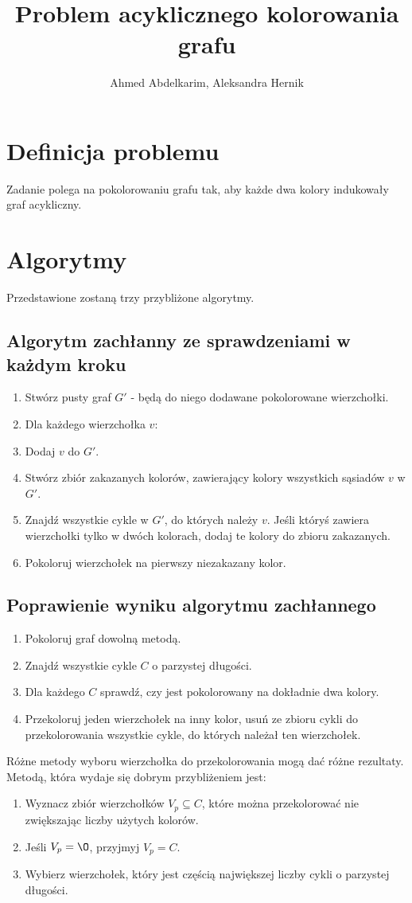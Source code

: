 \documentclass{article}
\title{Problem acyklicznego kolorowania grafu}
\author{Ahmed Abdelkarim, Aleksandra Hernik}
\begin{document}
\maketitle
\section{Definicja problemu}
Zadanie polega na pokolorowaniu grafu tak, aby każde dwa kolory indukowały graf acykliczny. 
\section{Algorytmy}
Przedstawione zostaną trzy przybliżone algorytmy.
\subsection{Algorytm zachłanny ze sprawdzeniami w każdym kroku}
\begin{enumerate}
\item Stwórz pusty graf $G'$ - będą do niego dodawane pokolorowane wierzchołki.
\item Dla każdego wierzchołka $v$:
\item Dodaj $v$ do $G'$.
\item Stwórz zbiór zakazanych kolorów, zawierający kolory wszystkich sąsiadów $v$ w $G'$.
\item Znajdź wszystkie cykle w $G'$, do których należy $v$. Jeśli któryś zawiera wierzchołki tylko w dwóch kolorach, dodaj te kolory do zbioru zakazanych.
\item Pokoloruj wierzchołek na pierwszy niezakazany kolor.
  
\end{enumerate}
\subsection{Poprawienie wyniku algorytmu zachłannego}
\begin{enumerate}
\item Pokoloruj graf dowolną metodą.
\item Znajdź wszystkie cykle $C$ o parzystej długości.
\item Dla każdego $C$ sprawdź, czy jest pokolorowany na dokładnie dwa kolory.
\item Przekoloruj jeden wierzchołek na inny kolor, usuń ze zbioru cykli do przekolorowania wszystkie cykle, do których należał ten wierzchołek.
\end{enumerate}
Różne metody wyboru wierzchołka do przekolorowania mogą dać różne rezultaty. Metodą, która wydaje się dobrym przybliżeniem jest:
\begin{enumerate}
\item Wyznacz zbiór wierzchołków $V_p \subseteq C$, które można przekolorować nie zwiększając liczby użytych kolorów.
\item Jeśli $V_p = \O$, przyjmyj $V_p = C$.
\item Wybierz wierzchołek, który jest częścią największej liczby cykli o parzystej długości.   
\end{enumerate}
\end{document}
